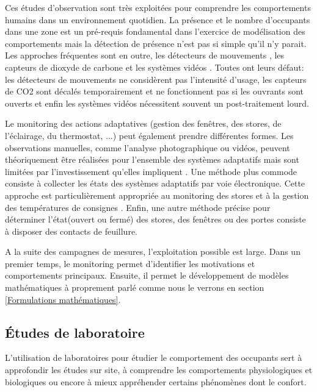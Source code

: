 Ces études d'observation sont très exploitées pour comprendre les comportements humains dans un environnement quotidien. La présence et le nombre d'occupants dans une zone est un pré-requis fondamental dans l'exercice de modélisation des comportements mais la détection de présence n'est pas si simple qu'il n'y parait. Les approches fréquentes sont en outre, les détecteurs de mouvements \cite{Benezeth-11}, les capteurs de dioxyde de carbone \cite{Gruber-14} et les systèmes vidéos \cite{Fleuret-08}. Toutes ont leurs défaut: les détecteurs de mouvements ne considèrent pas l'intensité d'usage, les capteurs de CO2 sont décalés temporairement et ne fonctionnent pas si les ouvrants sont ouverts et enfin les systèmes vidéos nécessitent souvent un post-traitement lourd. 

Le monitoring des actions adaptatives (gestion des fenêtres, des stores, de l'éclairage, du thermostat, ...) peut également prendre différentes formes. Les observations manuelles, comme l'analyse photographique ou vidéos, peuvent théoriquement être réalisées pour l'ensemble des systèmes adaptatifs mais sont limitées par l'investissement qu'elles impliquent \cite{Rea-84}. Une méthode plus commode consiste à collecter les états des systèmes adaptatifs par voie électronique. Cette approche est particulièrement appropriée au monitoring des stores \cite{Sutter-06} et à la gestion des températures de consignes \cite{Gunay-14}. Enfin, une autre méthode précise pour déterminer l'état(ouvert ou fermé) des stores, des fenêtres ou des portes consiste à disposer des contacts de feuillure. 

A la suite des campagnes de mesures, l'exploitation possible est large. Dans un premier temps, le monitoring permet d'identifier les motivations et comportements principaux. Ensuite, il permet le développement de modèles mathématiques à proprement parlé comme nous le verrons en section \ref{Formulations mathématiques}.

\subsection{Études de laboratoire}
\label{Études de laboratoire}

L'utilisation de laboratoires pour étudier le comportement des occupants sert à approfondir les études sur site, à comprendre les comportements physiologiques et biologiques ou encore à mieux appréhender certains phénomènes dont le confort.


